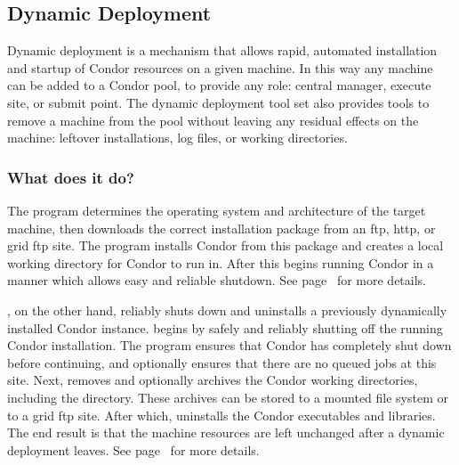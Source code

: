 \subsection{\label{sec:Dynamic-Deployment}Dynamic Deployment}

Dynamic deployment is a mechanism that allows rapid, automated
installation and startup of Condor resources on a given machine.  In
this way any machine can be added to a Condor pool, to provide any
role: central manager, execute site, or submit point.  The dynamic
deployment tool set also provides tools to remove a machine from the
pool without leaving any residual effects on the machine: leftover
installations, log files, or working directories.

\subsubsection{What does it do?}

The  program determines the operating system and
architecture of the target machine, then downloads the correct
installation package from an ftp, http, or grid ftp site.  The program
installs Condor from this package and creates a local working
directory for Condor to run in.  After this 
begins running Condor in a manner which allows easy and reliable
shutdown.  See page~\pageref{man-condor-cold-start} for more details.

, on the other hand, reliably shuts down and
uninstalls a previously dynamically installed Condor instance.
 begins by safely and reliably shutting off the
running Condor installation.  The program ensures that Condor has
completely shut down before continuing, and optionally ensures that
there are no queued jobs at this site.  Next, 
removes and optionally archives the Condor working directories,
including the  directory.  These archives can be stored to a
mounted file system or to a grid ftp site.  After which,
 uninstalls the Condor executables and libraries.
The end result is that the machine resources are left unchanged after
a dynamic deployment leaves.  See page~\pageref{man-condor-cold-stop}
for more details.

